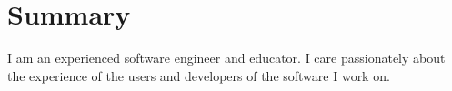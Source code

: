 \section{Summary}
I am an experienced software engineer and educator.  I care passionately about the experience of the users and developers of the software I work on.
